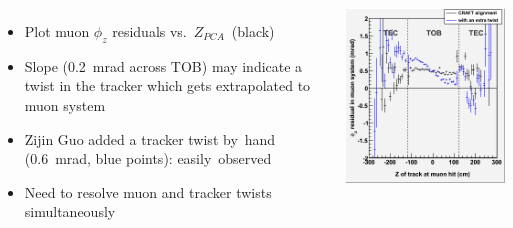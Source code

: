 \documentclass[compress]{beamer}
\begin{document}
\begin{frame}
\vspace{-0.6 cm}
\begin{columns}
\begin{itemize}
\item Plot muon $\phi_z$ residuals vs.\ \mbox{$Z_{PCA}$ (black)\hspace{-1 cm}}
\item Slope (0.2~mrad across TOB) may indicate a twist in the tracker which gets extrapolated to muon system
\item Zijin Guo added a tracker twist \mbox{by hand\hspace{-0.5 cm}} (0.6~mrad, blue points): \mbox{easily observed\hspace{-1 cm}}
\item Need to resolve muon and tracker twists simultaneously
\end{itemize}

\includegraphics[width=\linewidth]{phiresid_from_tracker_outer_twist2.png}
\end{columns}
\end{frame}
\end{document}
